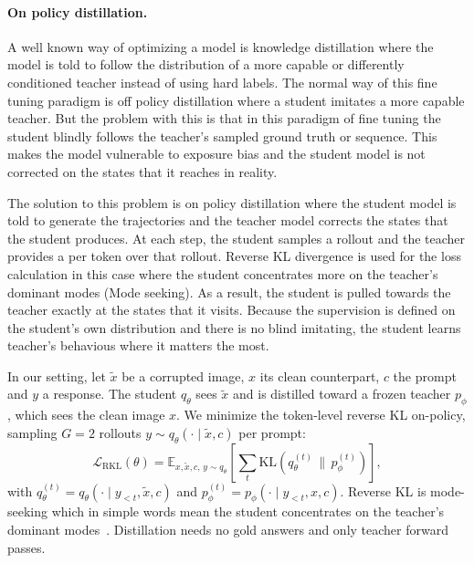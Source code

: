 \documentclass[10pt,twocolumn,letterpaper]{article}
\begin{document}
\paragraph{On policy distillation.}
A well known way of optimizing a model is knowledge distillation \citep{hinton2015distillingknowledgeneuralnetwork} where the model is told to follow the distribution of a more capable or differently conditioned teacher instead of using hard labels. The normal way of this fine tuning paradigm is off policy distillation where a student imitates a more capable teacher. But the problem with this is that in this paradigm of fine tuning the student blindly follows the teacher's sampled ground truth or sequence. This makes the model vulnerable to exposure bias and the student model is not corrected on the states that it reaches in reality.

The solution to this problem is on policy distillation \citep{agarwal2024onpolicydistillationlanguagemodels} where the student model is told to generate the trajectories and the teacher model corrects the states that the student produces. At each step, the student samples a rollout and the teacher provides a per token over that rollout. Reverse KL divergence is used for the loss calculation in this case where the student concentrates more on the teacher's dominant modes (Mode seeking). As a result, the student is pulled towards the teacher exactly at the states that it visits. Because the supervision is defined on the student's own distribution and there is no blind imitating, the student learns teacher's behavious where it matters the most. 


In our setting, let $\tilde{x}$ be a corrupted image, $x$ its clean counterpart, $c$ the prompt and $y$
a response. The student $q_\theta$ sees $\tilde{x}$ and is distilled toward a frozen
teacher $p_\phi$, which sees the clean image $x$. We minimize the token-level reverse
KL on-policy, sampling $G{=}2$ rollouts $y \sim q_\theta(\cdot \mid \tilde{x}, c)$ per
prompt:
\begin{equation}
\mathcal{L}_{\mathrm{RKL}}(\theta) =
\mathbb{E}_{x,\tilde{x},c,\,y\sim q_\theta}
\left[\sum_t \mathrm{KL}\!\left(q^{(t)}_\theta \,\big\|\, p^{(t)}_\phi\right)\right],
\label{eq:rkl}
\end{equation}
with $q^{(t)}_\theta = q_\theta(\cdot \mid y_{<t}, \tilde{x}, c)$ and
$p^{(t)}_\phi = p_\phi(\cdot \mid y_{<t}, x, c)$. Reverse KL is mode-seeking which in simple words mean the student
concentrates on the teacher's dominant modes~\cite{gu2024minillm}. Distillation needs no
gold answers and only teacher forward passes.
\end{document}
